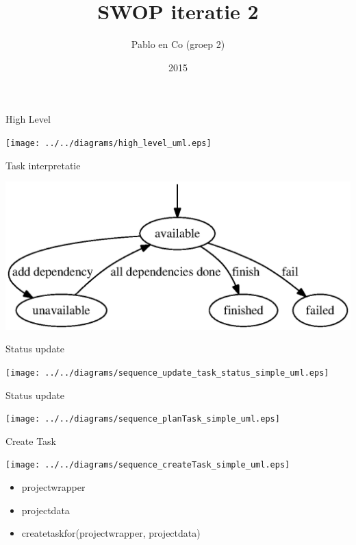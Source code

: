 \documentclass[mathserif,serif]{beamer}
\title{SWOP iteratie 2}
\author{Pablo en Co (groep 2)}
\institute{KU Leuven}
\date{2015}
\begin{document}
  \frame{\titlepage}

  \begin{frame}{High Level}
    \begin{center}
        \texttt{[image: ../../diagrams/high\_level\_uml.eps]}
    \end{center}
  \end{frame}

  \begin{frame}{Task interpretatie}
      \begin{center}
      \includegraphics[width=\textwidth,height=0.8\textheight,keepaspectratio]{../../diagrams/task_dfs.eps}
      \end{center}
  \end{frame}

  \begin{frame}{Status update}
      \begin{center}
      \texttt{[image: ../../diagrams/sequence\_update\_task\_status\_simple\_uml.eps]}
      \end{center}
  \end{frame}

  \begin{frame}{Status update}
      \begin{center}
      \texttt{[image: ../../diagrams/sequence\_planTask\_simple\_uml.eps]}
      \end{center}
  \end{frame}
  
  \begin{frame}{Create Task}
      \begin{center}
      \texttt{[image: ../../diagrams/sequence\_createTask\_simple\_uml.eps]}
        \begin{itemize}
        \item projectwrapper
        \item projectdata
        \item createtaskfor(projectwrapper, projectdata)
        \end{itemize}
      \end{center}
  \end{frame}
\end{document}
